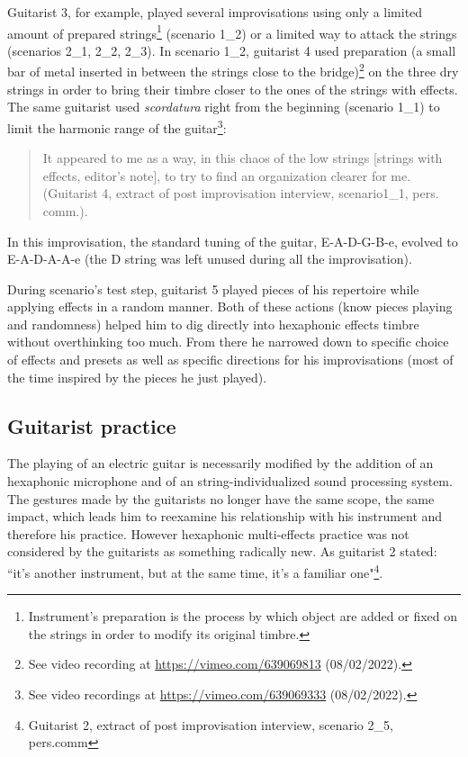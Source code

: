 \documentclass{article}
\begin{document}
Guitarist 3, for example, played several improvisations using only a limited amount of prepared strings\footnote{Instrument's preparation is the process by which object are added or fixed on the strings in order to modify its original timbre.} (scenario 1\_2) or a limited way to attack the strings (scenarios 2\_1, 2\_2, 2\_3). In scenario 1\_2, guitarist 4 used preparation (a small bar of metal inserted in between the strings close to the bridge)\footnote{See video recording at \url{https://vimeo.com/639069813} (08/02/2022).} on the three dry strings in order to bring their timbre closer to the ones of the strings with effects. The same guitarist used \textit{scordatura} right from the beginning (scenario 1\_1) to limit the harmonic range of the guitar\footnote{See video recordings at \url{https://vimeo.com/639069333} (08/02/2022).}:
    \begin{quote}
     It appeared to me as a way, in this chaos of the low strings [strings with effects, editor's note], to try to find an organization clearer for me. (Guitarist 4, extract of post improvisation interview, scenario1\_1, pers. comm.).
    \end{quote}
In this improvisation, the standard tuning of the guitar, E-A-D-G-B-e, evolved to E-A-D-A-A-e (the D string was left unused during all the improvisation). 

During scenario's test step, guitarist 5 played pieces of his repertoire while applying effects in a random manner. Both of these actions (know pieces playing and randomness) helped him to dig directly into hexaphonic effects timbre without overthinking too much. From there he narrowed down to specific choice of effects and presets as well as specific directions for his improvisations (most of the time inspired by the pieces he just played). 

\subsection{Guitarist practice}
The playing of an electric guitar is necessarily modified by the addition of an hexaphonic microphone and of an string-individualized sound processing system. The gestures made by the guitarists no longer have the same scope, the same impact, which leads him to reexamine his relationship with his instrument and therefore his practice.
However hexaphonic multi-effects practice was not considered by the guitarists as something radically new.  As guitarist 2 stated: ``it's another instrument, but at the same time, it's a familiar one"\footnote{Guitarist 2, extract of post improvisation interview,  scenario 2\_5, pers.comm}. 
\end{document}
